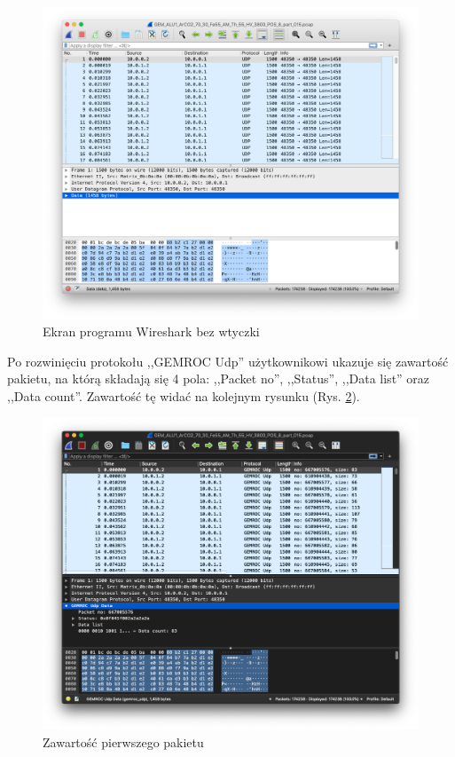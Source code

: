 \documentclass[a4paper, 12pt, twoside, openright]{article}
\begin{document}
		\begin{figure}[H]
			\centering
				\includegraphics[width=1.0\textwidth]{img/screenshot_no_dissector.png}
			\caption{Ekran programu Wireshark bez wtyczki}
			\label{fig:no_dis}
		\end{figure}


	Po rozwinięciu protokołu ,,GEMROC Udp'' użytkownikowi ukazuje się zawartość pakietu, na którą
	składają się 4 pola: ,,Packet no'', ,,Status'', ,,Data list'' oraz ,,Data count''.
	Zawartość tę widać na kolejnym rysunku (Rys. \ref{fig:dis_pack}).

		\begin{figure}[H]
			\centering
				\includegraphics[width=1.0\textwidth]{img/screenshot_dissector_list.png}
			\caption{Zawartość pierwszego pakietu}
			\label{fig:dis_pack}
		\end{figure}
\end{document}
